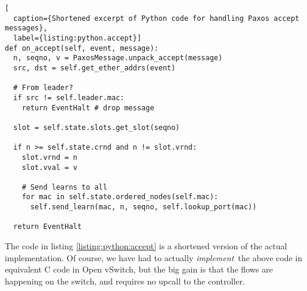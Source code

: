 \begin{lstlisting}[
  caption={Shortened excerpt of Python code for handling Paxos accept messages},
  label={listing:python.accept}]
def on_accept(self, event, message):
  n, seqno, v = PaxosMessage.unpack_accept(message)
  src, dst = self.get_ether_addrs(event)

  # From leader?
  if src != self.leader.mac:
    return EventHalt # drop message

  slot = self.state.slots.get_slot(seqno)

  if n >= self.state.crnd and n != slot.vrnd:
    slot.vrnd = n
    slot.vval = v

    # Send learns to all
    for mac in self.state.ordered_nodes(self.mac):
      self.send_learn(mac, n, seqno, self.lookup_port(mac))

  return EventHalt
\end{lstlisting}

The code in listing \ref{listing:python:accept} is a shortened version of the
actual implementation.
%
Of course, we have had to actually \textit{implement} the above code in
equivalent C code in Open vSwitch, but the big gain is that the flows are
happening on the switch, and requires no upcall to the controller.
